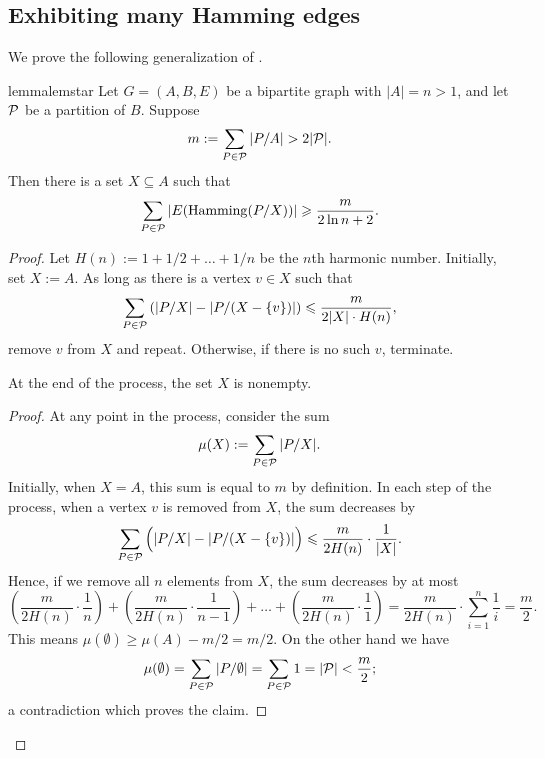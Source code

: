 \subsection{Exhibiting many Hamming edges}
We prove the following generalization of .

\begin{restatable}%
  {lemma}{lemstar}\label{lem:star}
  Let $G=(A,B,E)$ be a bipartite graph with $|A|=n>1$, and let $\cal P$ be a partition of $B$.
  Suppose
  \[
    m:=\sum_{P\in \cal P}|\inducedSS{P}{A}|> 2|\cal P|.
  \]
  Then there is a set $X\subseteq A$ such that
  \[
    \sum_{P\in \cal P}|E(\hamming(\inducedSS{P}{X}))|
    \ge \frac{m}{2\ln n+2}.
  \]
\end{restatable}
\begin{proof}
  Let $H(n):=1+1/2+\ldots+1/n$ be the $n$th harmonic number.
  Initially, set $X:=A$.
  As long as there is a vertex $v\in X$ such that 
  \[
    \sum_{P\in\cal P}\left(|\inducedSS{P}{X}|-|\inducedSS{P}{(X-\set v)}|\right)
    \le \frac{m}{2|X|\cdot H(n)},
  \]
  remove $v$ from $X$ and repeat. Otherwise, if there is no such $v$, terminate.
  

  \begin{claim}
    At the end of the process, the set $X$ is nonempty.
  \end{claim}
  \begin{proof}
    At any point in the process, consider the sum
    \[
      \mu(X):=\sum_{P\in \cal P}|\inducedSS{P}{X}|.
    \]
    Initially, when $X=A$, this sum is equal to $m$ by definition.
    In each step of the process, when a vertex $v$ is removed from $X$, the sum decreases by
    \[
      \sum_{P\in \cal P}\Big(|\inducedSS{P}{X}|-|\inducedSS{P}{(X-\set v)}|\Big)
      \le \frac{m}{2H(n)}\cdot \frac{1}{|X|}.
    \]
    Hence, if we remove all $n$ elements from $X$, the sum decreases by at most
    \[
      \left(\frac{m}{2H(n)}\cdot \frac{1}{n}\right) + \left(\frac{m}{2H(n)}\cdot \frac{1}{n-1}\right) + \ldots + \left(\frac{m}{2H(n)}\cdot \frac{1}{1}\right) = \frac{m}{2H(n)}\cdot \sum_{i=1}^n \frac 1 i
      = \frac{m}{2}.
    \]
    This means $\mu(\emptyset)\geq \mu(A) - m/2 = m/2$.
    On the other hand we have
    \[
      \mu(\emptyset)
      =\sum_{P\in\cal P}|\inducedSS{P}{\emptyset}|
      =\sum_{P\in\cal P}1
      =|\cal P|
      <\frac{m}{2};
    \]
    a contradiction which proves the claim.
  \end{proof}


\end{proof}
